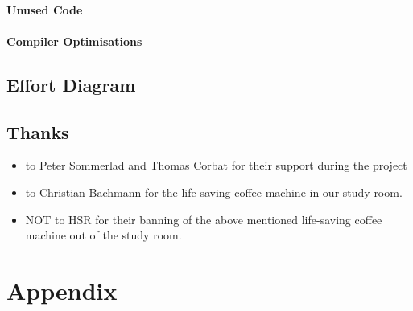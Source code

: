 \documentclass[12pt,halfparskip,DIV11,BCOR10mm]{scrreprt}
\begin{document}
\subsubsection{Unused Code}
\subsubsection{Compiler Optimisations}

\clearpage

\section{Effort Diagram}

\clearpage

\section{Thanks}

\begin{itemize}
	\item to Peter Sommerlad and Thomas Corbat for their support during the project
	\item to Christian Bachmann for the life-saving coffee machine in our study room. 
	\item NOT to HSR for their banning of the above mentioned life-saving coffee machine out of the study room.
\end{itemize}



\setcounter{secnumdepth}{-1}
\chapter{Appendix}


\listoffigures



\end{document}
